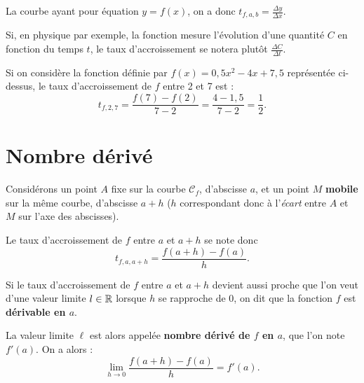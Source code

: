 \documentclass[a4paper,11pt]{article}
\begin{document}
\begin{crmq}
La courbe ayant pour équation $y=f(x)$, on a donc $t_{f,a,b}=\frac{\Delta y}{\Delta x}$.

\smallskip

Si, en physique par exemple, la fonction mesure l'évolution d'une quantité $C$ en fonction du temps $t$, le taux d'accroissement se notera plutôt $\frac{\Delta C}{\Delta t}$.
\end{crmq}

\begin{cexemple}
Si on considère la fonction définie par $f(x)=0,5x^2-4x+7,5$ représentée ci-dessus, le taux d'accroissement de $f$ entre 2 et 7 est : \vspace{-0.1cm} \[t_{f,2,7}=\frac{f(7)-f(2)}{7-2}=\frac{4-1,5}{7-2}=\frac{1}{2}.\]
\end{cexemple}

\section{Nombre dérivé}

\begin{cintro}
Considérons un point $A$ fixe sur la courbe $\mathscr{C}_f$, d'abscisse $a$, et un point $M$ \textbf{mobile} sur la même courbe, d'abscisse $a+h$ ($h$ correspondant donc à l'\emph{écart} entre $A$ et $M$ sur l'axe des abscisses).

Le taux d'accroissement de $f$ entre $a$ et $a+h$ se note donc \[t_{f,a,a+h}=\frac{f(a+h)-f(a)}{h}.\]
\end{cintro}

\begin{cdefi}
Si le taux d’accroissement de $f$ entre $a$ et $a+h$ devient aussi proche que l’on veut d’une valeur limite $l\in\R$ lorsque $h$ se rapproche de 0, on dit que la fonction $f$ est \textbf{dérivable en $a$}.

La valeur limite $\ell$ est alors appelée \textbf{nombre dérivé de $f$ en $a$}, que l’on note $f'(a)$. On a alors : \[\lim\limits_{h \rightarrow 0} \frac{f(a+h)-f(a)}{h}=f'(a).\]
\end{cdefi}
\end{document}
